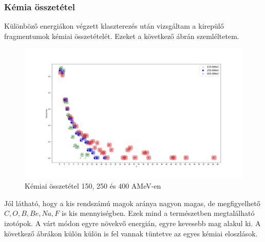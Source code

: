 \documentclass[a4paper,12pt]{article}
\begin{document}
\vspace{5mm}

\subsubsection{ Kémia összetétel}

\vspace{5mm}

\par Különböző energiákon végzett klaszterezés után vizsgáltam a kirepülő fragmentumok kémiai összetételét. Ezeket a következő ábrán szemléltetem.

\vspace{5mm}

\begin{figure}[H]
\centering
\includegraphics[width=1\textwidth]{./chemical.png}
\caption{Kémiai összetétel 150, 250 és 400 AMeV-en}
\end{figure}

\vspace{5mm}

\par Jól látható, hogy a kis rendszámú magok aránya nagyon magas, de megfigyelhető $C, O, B, Be, Na, F$ is kis mennyiségben. Ezek mind a természetben megtalálható izotópok. A várt módon egyre növekvő energián, egyre kevesebb mag alakul ki. A következő ábrákon külön külön is fel vannak tüntetve az egyes kémiai eloszlások.

\vspace{5mm}
\end{document}
